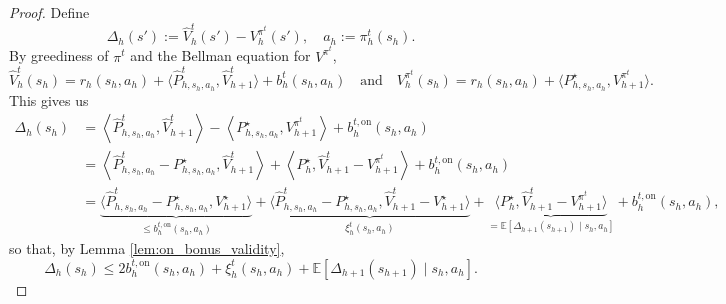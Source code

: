 \documentclass[twoside]{article}
\newcommand{\on}{\mathrm{on}} %
\newcommand{\bont}{b_h^{t,\on}} %
\begin{document}
\begin{proof}
Define
\[
\Delta_h(s') := \widehat{V}_h^{t}(s')-V_h^{\pi^t}(s'),\quad
a_h:=\pi_h^t(s_h).
\]
By greediness of \(\pi^t\) and the Bellman equation for \(V^{\pi^t}\),
\[
\widehat{V}_h^{t}(s_h)=r_h(s_h,a_h)+\langle \widehat{P}_{h,s_h,a_h}^{t},\widehat{V}_{h+1}^{t}\rangle+b_h^{t}(s_h,a_h)\quad\text{and}\quad V_h^{\pi^t}(s_h)=r_h(s_h,a_h)+\langle P_{h,s_h,a_h}^{\star},V_{h+1}^{\pi^t}\rangle.
\]
%
This gives us
\begin{align*}
\Delta_h(s_h) & = \left\langle\widehat{P}_{h,s_h,a_h}^{t},\widehat{V}_{h+1}^{t}\right\rangle- \left\langle P_{h,s_h,a_h}^{\star},V_{h+1}^{\pi^t}\right\rangle +\bont(s_h,a_h)\\
& = \left\langle \widehat{P}_{h,s_h,a_h}^{t} - P_{h,s_h,a_h}^{\star},\widehat{V}_{h+1}^{t} \right\rangle + \left\langle P_{h}^{\star},\widehat{V}_{h+1}^{t}-V_{h+1}^{\pi^t}\right\rangle + \bont(s_h,a_h)\\
& = \underbrace{\big\langle \widehat{P}_{h,s_h,a_h}^{t} - P_{h,s_h,a_h}^{\star},V_{h+1}^\star\big\rangle}_{\le \bont(s_h,a_h)}
+ \underbrace{\big\langle \widehat{P}_{h,s_h,a_h}^{t} - P_{h,s_h,a_h}^{\star},\widehat{V}_{h+1}^{t}-V_{h+1}^\star\big\rangle}_{\xi_h^{t}(s_h,a_h)}
+ \underbrace{\big\langle P_{h}^{\star},\widehat{V}_{h+1}^{t}-V_{h+1}^{\pi^t}\big\rangle}_{= \mathbb{E}[\Delta_{h+1}(s_{h+1})\mid s_h,a_h]}
+ \bont(s_h,a_h),
\end{align*}
%
so that, by Lemma \ref{lem:on_bonus_validity}, 
\begin{equation}
\Delta_h(s_h) \le 2\bont(s_h,a_h) + \xi_h^{t}(s_h,a_h) + \mathbb{E} \left[\Delta_{h+1}(s_{h+1})\mid s_h,a_h\right].
\label{eq:first_recur}
\end{equation}


\end{proof}
\end{document}

